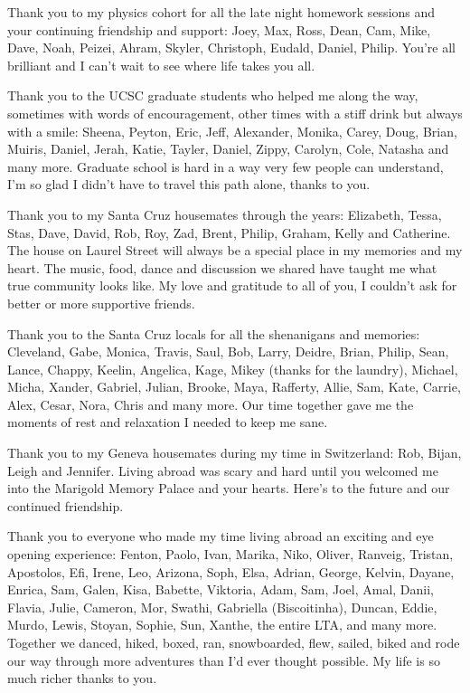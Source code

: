 Thank you to my physics cohort for all the late night homework sessions and
your continuing friendship and support: Joey, Max, Ross, Dean, Cam, Mike, Dave,
Noah, Peizei, Ahram, Skyler, Christoph, Eudald, Daniel, Philip.  You're all
brilliant and I can't wait to see where life takes you all. 

Thank you to the UCSC graduate students who helped me along the way, sometimes
with words of encouragement, other times with a stiff drink but always with a
smile: Sheena, Peyton, Eric, Jeff, Alexander, Monika, Carey, Doug, Brian,
Muiris, Daniel, Jerah, Katie, Tayler, Daniel, Zippy, Carolyn, Cole, Natasha and
many more.  Graduate school is hard in a way very few people can understand,
I'm so glad I didn't have to travel this path alone, thanks to you.

Thank you to my Santa Cruz housemates through the years: Elizabeth, Tessa,
Stas, Dave, David, Rob, Roy, Zad, Brent, Philip, Graham, Kelly and Catherine.
The house on Laurel Street will always be a special place in my memories and my
heart.  The music, food, dance and discussion we shared have taught me what
true community looks like.  My love and gratitude to all of you, I couldn't ask
for better or more supportive friends.

Thank you to the Santa Cruz locals for all the shenanigans and
memories: Cleveland, Gabe, Monica, Travis, Saul, Bob, Larry, Deidre, Brian,
Philip, Sean, Lance, Chappy, Keelin, Angelica, Kage, Mikey (thanks for the
laundry), Michael, Micha, Xander, Gabriel, Julian, Brooke, Maya, Rafferty,
Allie, Sam, Kate, Carrie, Alex, Cesar, Nora, Chris and many more. Our time
together gave me the moments of rest and relaxation I needed to keep me sane.

Thank you to my Geneva housemates during my time in Switzerland: Rob, Bijan,
Leigh and Jennifer.  Living abroad was scary and hard until you welcomed me
into the Marigold Memory Palace and your hearts.  Here's to the future and our
continued friendship. 

Thank you to everyone who made my time living abroad an exciting and eye
opening experience: Fenton, Paolo, Ivan, Marika, Niko, Oliver, Ranveig,
Tristan, Apostolos, Efi, Irene, Leo, Arizona, Soph, Elsa, Adrian, George,
Kelvin, Dayane, Enrica, Sam, Galen, Kisa, Babette, Viktoria, Adam, Sam, Joel,
Amal, Danii, Flavia, Julie, Cameron, Mor, Swathi, Gabriella (Biscoitinha),
Duncan, Eddie, Murdo, Lewis, Stoyan, Sophie, Sun, Xanthe, the entire LTA,  and
many more.  Together we danced, hiked, boxed, ran, snowboarded, flew, sailed,
biked and rode our way through more adventures than I'd ever thought possible.
My life is so much richer thanks to you.

